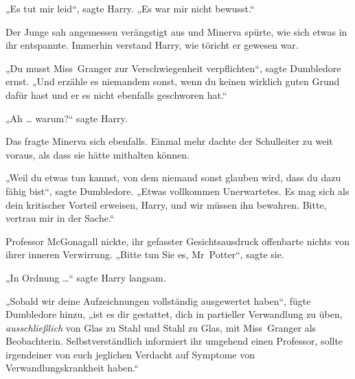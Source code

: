 „Es tut mir leid“, sagte Harry.
„Es war mir nicht bewusst.“

Der Junge sah angemessen verängstigt aus und Minerva spürte, wie sich etwas in ihr entspannte. Immerhin verstand Harry, wie töricht er gewesen war.

„Du musst Miss~Granger zur Verschwiegenheit verpflichten“, sagte Dumbledore ernst.
„Und erzähle es niemandem sonst, wenn du keinen wirklich guten Grund dafür hast und er es nicht ebenfalls geschworen hat.“

„Ah … warum?“ sagte Harry.

Das fragte Minerva sich ebenfalls. Einmal mehr dachte der Schulleiter zu weit voraus, als dass sie hätte mithalten können.

„Weil du etwas tun kannst, von dem niemand sonst glauben wird, dass du dazu fähig bist“, sagte Dumbledore.
„Etwas vollkommen Unerwartetes. Es mag sich als dein kritischer Vorteil erweisen, Harry, und wir müssen ihn bewahren. Bitte, vertrau mir in der Sache.“

Professor McGonagall nickte, ihr gefasster Gesichtsausdruck offenbarte nichts von ihrer inneren Verwirrung.
„Bitte tun Sie es, Mr~Potter“, sagte sie.

„In Ordnung …“ sagte Harry langsam.

„Sobald wir deine Aufzeichnungen vollständig ausgewertet haben“, fügte Dumbledore hinzu, „ist es dir gestattet, dich in partieller Verwandlung zu üben, \emph{ausschließlich} von Glas zu Stahl und Stahl zu Glas, mit Miss~Granger als Beobachterin. Selbstverständlich informiert ihr umgehend einen Professor, sollte irgendeiner von euch jeglichen Verdacht auf Symptome von Verwandlungskrankheit haben.“

